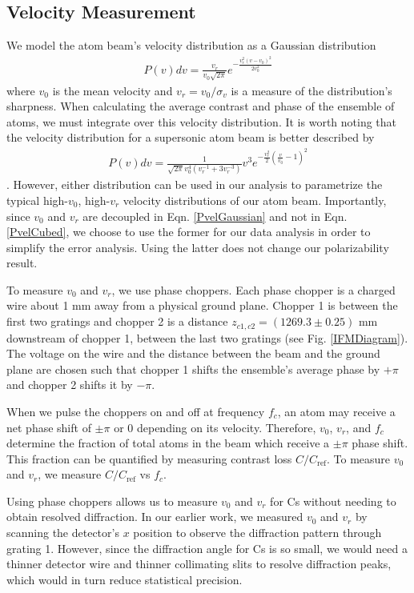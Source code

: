 \documentclass[twocolumn,prl,showpacs,superscriptaddress]{revtex4-1}   %
\newcommand{\figref}[1]{Fig. \ref{#1}}
\newcommand{\eqnref}[1]{Eqn. \eqref{#1}}
\begin{document}
\subsection{Velocity Measurement}

We model the atom beam's velocity distribution as a Gaussian distribution
\begin{align}
	P(v)dv = \frac{v_r}{v_0\sqrt{2\pi}}e^{-\frac{v_r^2(v-v_0)^2}{2v_0^2}}
	\label{PvelGaussian}
\end{align}
where $v_0$ is the mean velocity and $v_r = v_0/\sigma_v$ is a measure of the distribution's sharpness. When calculating the average contrast and phase of the ensemble of atoms, we must integrate over this velocity distribution. It is worth noting that the velocity distribution for a supersonic atom beam is better described by
\begin{align}
	P(v)dv = \frac{1}{\sqrt{2\pi}v_0^4(v_r^{-1}+3v_r^{-3})}
	v^3
	e^{-\frac{v_r^2}{2}\left(\frac{v}{v_0}-1\right)^2}
	\label{PvelCubed}
\end{align}
\cite{Berman1997}. However, either distribution can be used in our analysis to parametrize the typical high-$v_0$, high-$v_r$ velocity distributions of our atom beam. Importantly, since $v_0$ and $v_r$ are decoupled in \eqnref{PvelGaussian} and not in \eqnref{PvelCubed}, we choose to use the former for our data analysis in order to simplify the error analysis. Using the latter does not change our polarizability result. 

To measure $v_0$ and $v_r$, we use phase choppers. Each phase chopper is a charged wire about 1 mm away from a physical ground plane. Chopper 1 is between the first two gratings and chopper 2 is a distance $z_{c1,c2} = (1269.3 \pm 0.25)$ mm downstream of chopper 1, between the last two gratings (see \figref{IFMDiagram}). The voltage on the wire and the distance between the beam and the ground plane are chosen such that chopper 1 shifts the ensemble's average phase by $+\pi$ and chopper 2 shifts it by $-\pi$. 

When we pulse the choppers on and off at frequency $f_c$, an atom may receive a net phase shift of $\pm\pi$ or $0$ depending on its velocity. Therefore, $v_0$, $v_r$, and $f_c$ determine the fraction of total atoms in the beam which receive a $\pm\pi$ phase shift. This fraction can be quantified by measuring contrast loss $C/C_{\mathrm{ref}}$. To measure $v_0$ and $v_r$, we measure $C/C_{\mathrm{ref}}$ vs $f_c$.

Using phase choppers allows us to measure $v_0$ and $v_r$ for Cs without needing to obtain resolved diffraction. In our earlier work, we measured $v_0$ and $v_r$ by scanning the detector's $x$ position to observe the diffraction pattern through grating 1. However, since the diffraction angle for Cs is so small, we would need a thinner detector wire and thinner collimating slits to resolve diffraction peaks, which would in turn reduce statistical precision.
\end{document}
